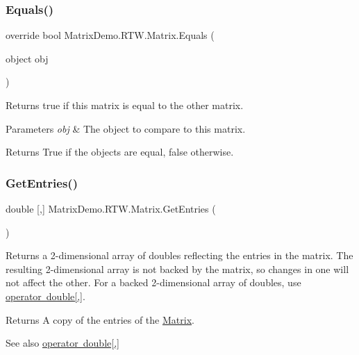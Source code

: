 \subsubsection{\texorpdfstring{Equals()}{Equals()}}
{\footnotesize\ttfamily override bool Matrix\+Demo.\+R\+T\+W.\+Matrix.\+Equals (\begin{DoxyParamCaption}\item[{object}]{obj }\end{DoxyParamCaption})}



Returns true if this matrix is equal to the other matrix. 


\begin{DoxyParams}{Parameters}
{\em obj} & The object to compare to this matrix.\\
\hline
\end{DoxyParams}
\begin{DoxyReturn}{Returns}
True if the objects are equal, false otherwise.
\end{DoxyReturn}
\mbox{\label{class_matrix_demo_1_1_r_t_w_1_1_matrix_a9f6f8e0e7acfbdd55852f258daf68b8f}} 
\subsubsection{\texorpdfstring{Get\+Entries()}{GetEntries()}}
{\footnotesize\ttfamily double \mbox{[},\mbox{]} Matrix\+Demo.\+R\+T\+W.\+Matrix.\+Get\+Entries (\begin{DoxyParamCaption}{ }\end{DoxyParamCaption})}



Returns a 2-\/dimensional array of doubles reflecting the entries in the matrix. The resulting 2-\/dimensional array is not backed by the matrix, so changes in one will not affect the other. For a backed 2-\/dimensional array of doubles, use \mbox{\hyperlink{class_matrix_demo_1_1_r_t_w_1_1_matrix_ac23641ac04b3c3baf14174bdf9049db2}{operator double\mbox{[},\mbox{]}}}. 

\begin{DoxyReturn}{Returns}
A copy of the entries of the \mbox{\hyperlink{class_matrix_demo_1_1_r_t_w_1_1_matrix}{Matrix}}.
\end{DoxyReturn}
\begin{DoxySeeAlso}{See also}
\mbox{\hyperlink{class_matrix_demo_1_1_r_t_w_1_1_matrix_ac23641ac04b3c3baf14174bdf9049db2}{operator double\mbox{[},\mbox{]}}}


\end{DoxySeeAlso}
\mbox{\label{class_matrix_demo_1_1_r_t_w_1_1_matrix_ad7f43b0fc8f78f4deb76238d99749d1d}} 
